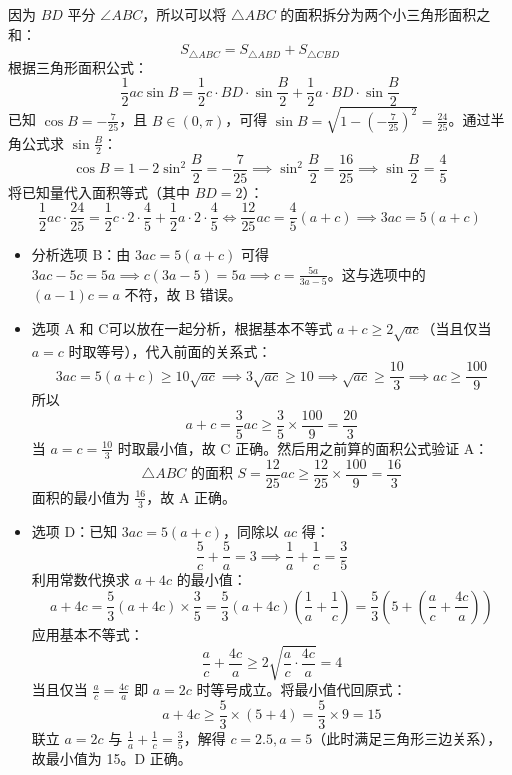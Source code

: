 \documentclass[lang=cn,11pt]{elegantbook}
\begin{document}
\begin{solution}
因为 $BD$ 平分 $\angle ABC$，所以可以将 $\triangle ABC$ 的面积拆分为两个小三角形面积之和：
$$S_{\triangle ABC} = S_{\triangle ABD} + S_{\triangle CBD}$$
根据三角形面积公式：
$$\frac{1}{2}ac\sin B = \frac{1}{2}c \cdot BD \cdot \sin\frac{B}{2} + \frac{1}{2}a \cdot BD \cdot \sin\frac{B}{2}$$
已知 $\cos B = -\frac{7}{25}$，且 $B \in (0, \pi)$，可得 $\sin B = \sqrt{1 - \left(-\frac{7}{25}\right)^2} = \frac{24}{25}$。通过半角公式求 $\sin\frac{B}{2}$：
$$\cos B = 1 - 2\sin^2\frac{B}{2} = -\frac{7}{25} \implies \sin^2\frac{B}{2} = \frac{16}{25} \implies \sin\frac{B}{2} = \frac{4}{5}$$
将已知量代入面积等式（其中 $BD = 2$）：
$$\frac{1}{2}ac \cdot \frac{24}{25} = \frac{1}{2}c \cdot 2 \cdot \frac{4}{5} + \frac{1}{2}a \cdot 2 \cdot \frac{4}{5}\Longleftrightarrow\frac{12}{25}ac = \frac{4}{5}(a+c) \implies 3ac = 5(a+c)$$
\begin{itemize}
\item 分析选项 B：由 $3ac = 5(a+c)$ 可得 $3ac - 5c = 5a \implies c(3a - 5) = 5a \implies c = \frac{5a}{3a-5}$。这与选项中的 $(a-1)c = a$ 不符，故 B 错误。
\item 选项 A 和 C可以放在一起分析，根据基本不等式 $a+c \ge 2\sqrt{ac}$（当且仅当 $a=c$ 时取等号），代入前面的关系式：$$3ac = 5(a+c) \ge 10\sqrt{ac}\implies 3\sqrt{ac} \ge 10 \implies \sqrt{ac} \ge \frac{10}{3} \implies ac \ge \frac{100}{9}$$
所以$$a+c = \frac{3}{5}ac \ge \frac{3}{5} \times \frac{100}{9} = \frac{20}{3}$$当 $a = c = \frac{10}{3}$ 时取最小值，故 C 正确。然后用之前算的面积公式验证 A：$$\triangle ABC \text{ 的面积 } S = \frac{12}{25}ac \ge \frac{12}{25} \times \frac{100}{9} = \frac{16}{3}$$面积的最小值为 $\frac{16}{3}$，故 A 正确。
\item 选项 D：已知 $3ac = 5(a+c)$，同除以 $ac$ 得：$$\frac{5}{c} + \frac{5}{a} = 3 \implies \frac{1}{a} + \frac{1}{c} = \frac{3}{5}$$
利用常数代换求 $a+4c$ 的最小值：$$a+4c = \frac{5}{3} (a+4c) \times \frac{3}{5} = \frac{5}{3} (a+4c)\left(\frac{1}{a} + \frac{1}{c}\right)=\frac53\left(5 + \left(\frac{a}{c} + \frac{4c}{a}\right)\right)$$
应用基本不等式：$$\frac{a}{c} + \frac{4c}{a} \ge 2\sqrt{\frac{a}{c} \cdot \frac{4c}{a}} = 4$$当且仅当 $\frac{a}{c} = \frac{4c}{a}$ 即 $a = 2c$ 时等号成立。将最小值代回原式：$$a+4c \ge \frac{5}{3} \times (5 + 4) = \frac{5}{3} \times 9 = 15$$联立 $a=2c$ 与 $\frac{1}{a}+\frac{1}{c}=\frac{3}{5}$，解得 $c=2.5, a=5$（此时满足三角形三边关系），故最小值为 15。D 正确。
\end{itemize}
\end{solution}
\end{document}
